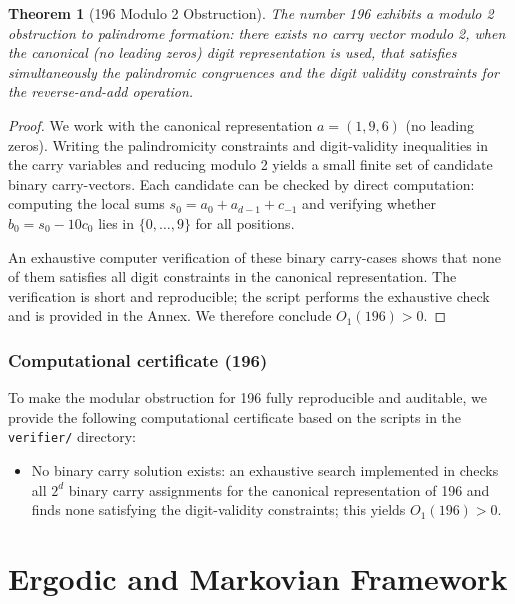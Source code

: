 \documentclass[11pt,a4paper]{article}
\theoremstyle{plain}
\newtheorem{theorem}{Theorem}[section]
\theoremstyle{definition}
\begin{document}
\begin{theorem}[196 Modulo 2 Obstruction]\label{thm:196_mod2}
The number 196 exhibits a modulo 2 obstruction to palindrome formation: there exists no carry vector modulo 2, when the canonical (no leading zeros) digit representation is used, that satisfies simultaneously the palindromic congruences and the digit validity constraints for the reverse-and-add operation.
\end{theorem}

\begin{proof}
We work with the canonical representation $a=(1,9,6)$ (no leading zeros). Writing the palindromicity constraints and digit-validity inequalities in the carry variables and reducing modulo 2 yields a small finite set of candidate binary carry-vectors. Each candidate can be checked by direct computation: computing the local sums $s_0=a_0+a_{d-1}+c_{-1}$ and verifying whether $b_0=s_0-10c_0$ lies in $\{0,\ldots,9\}$ for all positions.

An exhaustive computer verification of these binary carry-cases shows that none of them satisfies all digit constraints in the canonical representation. The verification is short and reproducible; the script \texttt{} performs the exhaustive check and is provided in the Annex. We therefore conclude $O_1(196)>0$.
\end{proof}

\subsubsection{Computational certificate (196)}
To make the modular obstruction for 196 fully reproducible and auditable, we provide the following computational certificate based on the scripts in the \texttt{verifier/} directory:
\begin{itemize}
\item No binary carry solution exists: an exhaustive search implemented in \texttt{} checks all $2^d$ binary carry assignments for the canonical representation of 196 and finds none satisfying the digit-validity constraints; this yields $O_1(196)>0$.
\end{itemize}

\section{Ergodic and Markovian Framework}
\label{sec:ergodic_markov}
\end{document}
